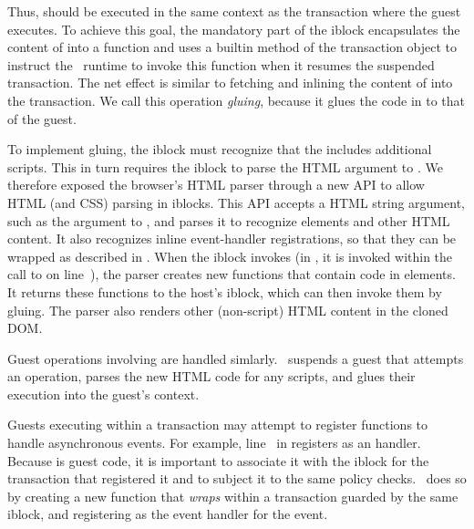 Thus,  should be executed in the same context as the
transaction where the guest executes.  To achieve this goal, the
mandatory part of the iblock encapsulates the content of  into a
function and uses a builtin 
method of the transaction object to
instruct the \txjs\ runtime to invoke this function when it resumes the
suspended transaction. The net effect is similar to fetching
and inlining the content of  into the transaction. We call this
operation \textit{gluing}, because it glues the code in
 to that of the guest.

To implement gluing, the iblock must recognize that the 
includes additional scripts. This in turn requires the iblock to
parse the HTML argument to . We therefore exposed  the
browser's HTML parser through a new  API to allow
HTML (and CSS) parsing in iblocks. This API accepts a
HTML string argument, such as the argument to
, and parses it to recognize  elements and
other HTML content. It also recognizes inline event-handler registrations, so
that they can be wrapped as described in
.  When the iblock invokes
 (in , it is invoked within the
call to  on line~), the parser creates new
functions that contain code in  elements.  It returns these
functions to the host's iblock, which can then invoke them
by gluing. The parser also renders other (non-script) HTML
content in the cloned DOM\@. 

Guest operations involving  are handled simlarly. \txjs\
suspends a guest that attempts an  operation, parses the
new HTML code for any scripts, and glues their execution
into the guest's context.

\label{section:design:iblock:wrapper}
%
Guests executing within a transaction may attempt to register functions to
handle asynchronous events.  For example, line~\lnobig{8} in
 registers  as an 
handler. Because \code{displayAds} is guest code, it is important to associate
it with the iblock for the transaction that registered it and to subject it to
the same policy checks.  \txjs\ does so by creating a new function
 that \textit{wraps} \code{displayAds} within a
transaction guarded by the same iblock, and registering \code{tx\_displayAds}
as the event handler for the \code{onMouseOver} event.

